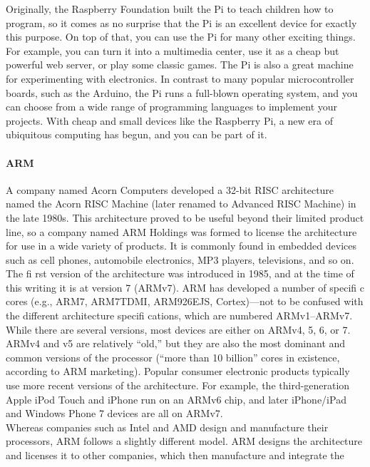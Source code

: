 Originally, the Raspberry Foundation \citep{2} built the Pi to teach children how to
program, so it comes as no surprise that the Pi is an excellent device for
exactly this purpose. 
On top of that, you can use the Pi for many other
exciting things. For example, you can turn it into a multimedia center, use it as a cheap but powerful web server, or play some classic games.
The Pi is also a great machine for experimenting with electronics. In contrast
to many popular microcontroller boards, such as the Arduino, the Pi runs a
full-blown operating system, and you can choose from a wide range of programming
languages to implement your projects.
With cheap and small devices like the Raspberry Pi, a new era of ubiquitous
computing has begun, and you can be part of it.


\paragraph*{ARM}
\hfill \break
A company named Acorn Computers developed a 32-bit RISC architecture named
the Acorn RISC Machine (later renamed to Advanced RISC Machine) in the late
1980s. This architecture proved to be useful beyond their limited product line,
so a company named ARM Holdings was formed to license the architecture for
use in a wide variety of products. It is commonly found in embedded devices
such as cell phones, automobile electronics, MP3 players, televisions, and so on.
The fi rst version of the architecture was introduced in 1985, and at the time of
this writing it is at version 7 (ARMv7). ARM has developed a number of specifi c
cores (e.g., ARM7, ARM7TDMI, ARM926EJS, Cortex)—not to be confused with
the different architecture specifi cations, which are numbered ARMv1–ARMv7.
While there are several versions, most devices are either on ARMv4, 5, 6, or 7.
ARMv4 and v5 are relatively “old,” but they are also the most dominant and
common versions of the processor (“more than 10 billion” cores in existence,
according to ARM marketing). Popular consumer electronic products typically
use more recent versions of the architecture. For example, the third-generation
Apple iPod Touch and iPhone run on an ARMv6 chip, and later iPhone/iPad
and Windows Phone 7 devices are all on ARMv7.\\
\-\hspace{1cm}Whereas companies such as Intel and AMD design and manufacture their
processors, ARM follows a slightly different model. ARM designs the architecture
and licenses it to other companies, which then manufacture and integrate the
